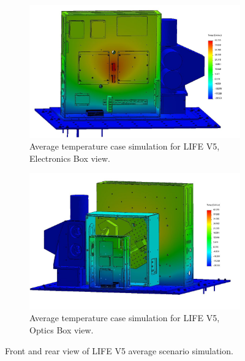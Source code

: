 \begin{figure}
    \centering
    \begin{subfigure}[h]{0.9\textwidth}
        \centering
        \includegraphics[width=\textwidth]{chap3_images/LIFE_V5_initial_images/Iteration_2_ebox_no_labels.JPG}
        \caption{Average temperature case simulation for LIFE V5, Electronics Box view.}
        \label{fig:LIFE_V5_TA_AVG_EBOX}
    \end{subfigure}
    \begin{subfigure}[h]{0.9\textwidth}
        \centering
        \includegraphics[width=\textwidth]{chap3_images/LIFE_V5_initial_images/Iteration_2_no_labels.JPG}
        \caption{Average temperature case simulation for LIFE V5, Optics Box view.}
        \label{fig:LIFE_V4_TA_AVG_OBOX}
    \end{subfigure}
    \caption{Front and rear view of LIFE V5 average scenario simulation.}
    \label{LIFE_V5_Prelim_TA_AVG}
\end{figure}

